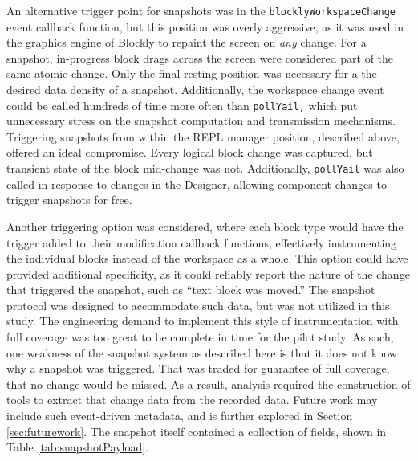 An alternative trigger point for snapshots was in the \texttt{blocklyWorkspaceChange} event callback function, but this position was overly aggressive, as it was used in the graphics engine of Blockly to repaint the screen on \emph{any} change. For a snapshot, in-progress block drags across the screen were considered part of the same atomic change. Only the final resting position was necessary for a the desired data density of a snapshot. Additionally, the workspace change event could be called hundreds of time more often than \texttt{pollYail,} which put unnecessary stress on the snapshot computation and transmission mechanisms. Triggering snapshots from within the REPL manager position, described above, offered an ideal compromise. Every logical block change was captured, but transient state of the block mid-change was not. Additionally, \texttt{pollYail} was also called in response to changes in the Designer, allowing component changes to trigger snapshots for free.

Another triggering option was considered, where each block type would have the trigger added to their modification callback functions, effectively instrumenting the individual blocks instead of the workspace as a whole. This option could have provided additional specificity, as it could reliably report the nature of the change that triggered the snapshot, such as ``text block was moved.'' The snapshot protocol was designed to accommodate such data, but was not utilized in this study. The engineering demand to implement this style of instrumentation with full coverage was too great to be complete in time for the pilot study. As such, one weakness of the snapshot system as described here is that it does not know why a snapshot was triggered. That was traded for guarantee of full coverage, that no change would be missed. As a result, analysis required the construction of tools to extract that change data from the recorded data. Future work may include such event-driven metadata, and is further explored in Section \ref{sec:futurework}. The snapshot itself contained a collection of fields, shown in Table \ref{tab:snapshotPayload}. 

